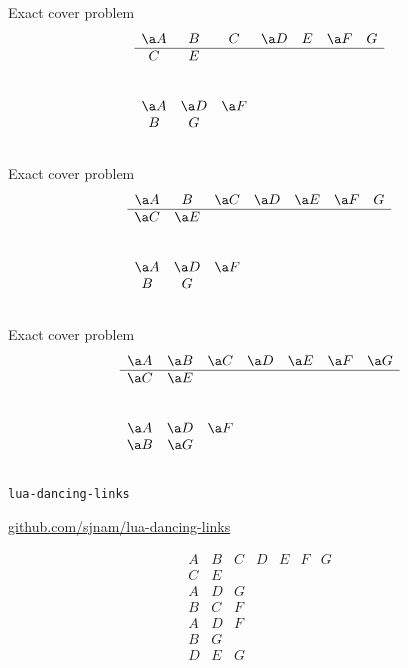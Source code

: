 \documentclass[xcolor=svgnames]{beamer}
\begin{document}
%
\begin{frame}{Exact cover problem} 
\Large\boldmath
  $$
  \begin{array}{ccccccc}
    \a A & B & C & \a D & E & \a F & G\\
    \hline
    C & E &&&&&\\
    &&&&&&\\
    &&&&&&\\
    \a A & \a D & \a F &&&&\\
    B & G &&&&&\\
    &&&&&&
  \end{array}
  $$
\end{frame}

%
\begin{frame}{Exact cover problem} 
\Large\boldmath
  $$
  \begin{array}{ccccccc}
    \a A & B & \a C & \a D & \a E & \a F & G\\
    \hline
    \a C & \a E &&&&&\\
    &&&&&&\\
    &&&&&&\\
    \a A & \a D & \a F &&&&\\
    B & G &&&&&\\
    &&&&&&
  \end{array}
  $$
\end{frame}

%
\begin{frame}{Exact cover problem} 
\Large\boldmath
  $$
  \begin{array}{ccccccc}
    \a A & \a B & \a C & \a D
    & \a E & \a F & \a G\\
    \hline
    \a C & \a E &&&&&\\
    &&&&&&\\
    &&&&&&\\
    \a A & \a D & \a F &&&&\\
    \a B & \a G &&&&&\\
    &&&&&&
  \end{array}
  $$
\end{frame}

%
\begin{frame}{\texttt{lua-dancing-links}}
\begin{center}
  \href{https://github.com/sjnam/lua-dancing-links}
       {github.com/sjnam/lua-dancing-links}
\end{center}
$$
  \begin{array}{ccccccc}
    A & B & C & D & E & F & G\\
    C & E &&&&&\\
    A & D & G &&&&\\
    B & C & F &&&&\\
    A & D & F &&&&\\
    B & G &&&&&\\
    D & E & G &&&&
  \end{array}
$$
\end{frame}
\end{document}
